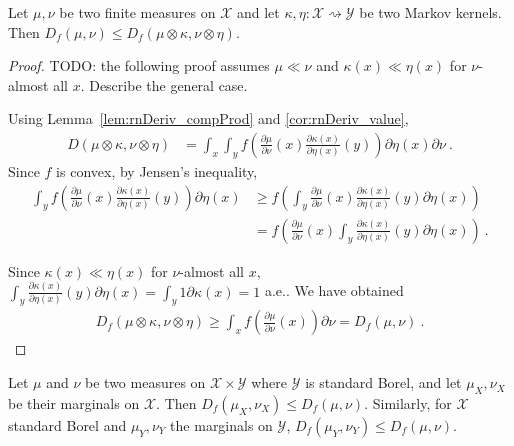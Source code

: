 \begin{theorem}
  \label{thm:fDiv_le_compProd_1}
  \leanok
  Let $\mu, \nu$ be two finite measures on $\mathcal X$ and let $\kappa, \eta : \mathcal X \rightsquigarrow \mathcal Y$ be two Markov kernels.
  Then $D_f(\mu, \nu) \le D_f(\mu \otimes \kappa, \nu \otimes \eta)$.
\end{theorem}

\begin{proof}\leanok
{}
TODO: the following proof assumes $\mu \ll \nu$ and $\kappa(x) \ll \eta(x)$ for $\nu$-almost all $x$. Describe the general case.

Using Lemma~\ref{lem:rnDeriv_compProd} and \ref{cor:rnDeriv_value},
\begin{align*}
D(\mu \otimes \kappa, \nu \otimes \eta)
&= \int_x \int_y f \left( \frac{\partial \mu}{\partial\nu}(x) \frac{\partial \kappa(x)}{\partial\eta(x)}(y) \right) \partial \eta(x) \partial \nu
\: .
\end{align*}
Since $f$ is convex, by Jensen's inequality,
\begin{align*}
\int_y f \left( \frac{\partial \mu}{\partial\nu}(x) \frac{\partial \kappa(x)}{\partial\eta(x)}(y) \right) \partial \eta(x)
&\ge f \left( \int_y \frac{\partial \mu}{\partial\nu}(x) \frac{\partial \kappa(x)}{\partial\eta(x)}(y) \partial \eta(x) \right)
\\
&= f \left( \frac{\partial \mu}{\partial\nu}(x) \int_y \frac{\partial \kappa(x)}{\partial\eta(x)}(y) \partial \eta(x) \right)
\: .
\end{align*}

Since $\kappa(x) \ll \eta(x)$ for $\nu$-almost all $x$, $\int_y \frac{\partial \kappa(x)}{\partial\eta(x)}(y) \partial \eta(x) = \int_y 1 \partial \kappa(x) = 1$ a.e.. We have obtained
\begin{align*}
D_f(\mu \otimes \kappa, \nu \otimes \eta)
\ge \int_x f \left( \frac{\partial \mu}{\partial\nu}(x)\right) \partial \nu
= D_f(\mu, \nu)
\: .
\end{align*}
\end{proof}

\begin{theorem}[Marginals]
  \label{thm:fDiv_fst_le_1}
  \leanok
  Let $\mu$ and $\nu$ be two measures on $\mathcal X \times \mathcal Y$ where $\mathcal Y$ is standard Borel, and let $\mu_X, \nu_X$ be their marginals on $\mathcal X$.
  Then $D_f(\mu_X, \nu_X) \le D_f(\mu, \nu)$.
  Similarly, for $\mathcal X$ standard Borel and $\mu_Y, \nu_Y$ the marginals on $\mathcal Y$, $D_f(\mu_Y, \nu_Y) \le D_f(\mu, \nu)$.
\end{theorem}

